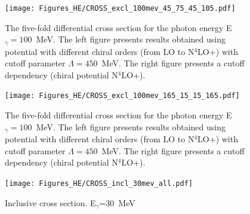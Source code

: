         \begin{figure}[h]
            \begin{center}
                \texttt{[image: Figures\_HE/CROSS\_excl\_100mev\_45\_75\_45\_105.pdf]}
                \end{center}
                \caption{The five-fold differential cross section for the photon 
                energy E$_\gamma=100$~MeV.
                The left figure presents results obtained using potential
                with different chiral orders (from LO to N$^4$LO+) with cutoff parameter $\Lambda=450$~MeV.
                The right figure presents a cutoff dependency (chiral potential N$^4$LO+).}
                \label{CROSS_HE_EXCL_45_75_45_105}
        \end{figure}

        \begin{figure}[h]
            \begin{center}
                \texttt{[image: Figures\_HE/CROSS\_excl\_100mev\_165\_15\_15\_165.pdf]}
                \end{center}
                \caption{The five-fold differential cross section for the photon 
                energy E$_\gamma=100$~MeV.
                The left figure presents results obtained using potential
                with different chiral orders (from LO to N$^4$LO+) with cutoff parameter $\Lambda=450$~MeV.
                The right figure presents a cutoff dependency (chiral potential N$^4$LO+).}
                \label{CROSS_HE_EXCL_165_15_15_165}
        \end{figure}



        \begin{figure}[h]
            \begin{center}
            \texttt{[image: Figures\_HE/CROSS\_incl\_30mev\_all.pdf]}
            \end{center}
            \caption{Inclusive cross section. E$_\gamma$=30~MeV}
        \end{figure}

